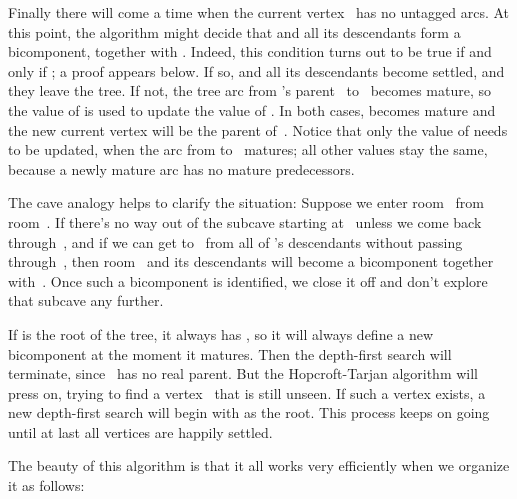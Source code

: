 Finally there will come a time when the current vertex~ has no
untagged arcs. At this point, the
algorithm might decide that  and all its descendants
form a bicomponent, together with .
Indeed, this condition turns out to be true if and only if
; a proof appears below. If so, 
and all its descendants
become settled, and they leave the tree. If not, the tree arc from
's parent~ to~ becomes mature, so the value of  is
used to update the value of . In both cases, 
becomes mature
and the new current vertex will be the parent of~. Notice that only the
value of  needs to be updated, when the arc from 
to~
matures; all other values  stay the same, because a newly
mature arc has no mature predecessors.

The cave analogy helps to clarify the situation: Suppose we enter
room~ from room~. If there's no way out of the subcave starting
at~ unless we come back through~, and if we can get to~
from
all of 's descendants without passing through~, then room~
and its descendants will become a bicomponent together with~.  Once
such a bicomponent is identified, we close it off and don't explore
that subcave any further.

If  is the root of the tree, it always has , so it
will always define a new bicomponent at the moment it matures.  Then
the depth-first search will terminate, since ~has no real parent.
But the Hopcroft-Tarjan algorithm will press on, trying to find a
vertex~ that is still unseen. If such a vertex exists, a
new depth-first search will begin with  as the root. This process
keeps on going until at last all vertices are happily settled.

The beauty of this algorithm is that it all works very efficiently
when we organize it as follows:

